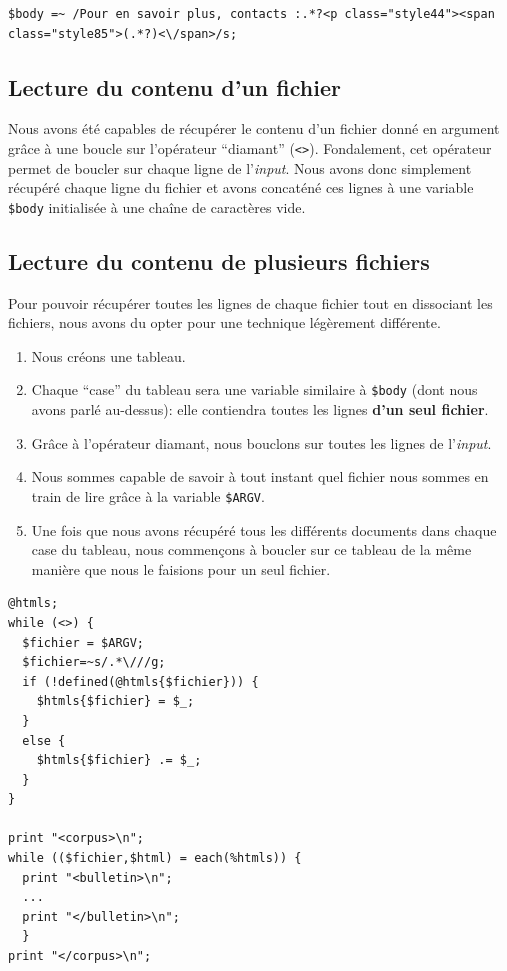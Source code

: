 \begin{lstlisting}
$body =~ /Pour en savoir plus, contacts :.*?<p class="style44"><span class="style85">(.*?)<\/span>/s;
\end{lstlisting}

\subsection{Lecture du contenu d'un fichier}

Nous avons été capables de récupérer le contenu d'un fichier donné en argument grâce à une boucle sur l'opérateur ``diamant'' (\lstinline{<>}). Fondalement, cet opérateur permet de boucler sur chaque ligne de l'\textit{input}. Nous avons donc simplement récupéré chaque ligne du fichier et avons concaténé ces lignes à une variable \lstinline{$body} initialisée à une chaîne de caractères vide.

\subsection{Lecture du contenu de plusieurs fichiers}

Pour pouvoir récupérer toutes les lignes de chaque fichier tout en dissociant les fichiers, nous avons du opter pour une technique légèrement différente.

\begin{enumerate}
  \item Nous créons une tableau.
  \item Chaque ``case'' du tableau sera une variable similaire à \lstinline{$body} (dont nous avons parlé au-dessus): elle contiendra toutes les lignes \textbf{d'un seul fichier}.
  \item Grâce à l'opérateur diamant, nous bouclons sur toutes les lignes de l'\textit{input}.
  \item Nous sommes capable de savoir à tout instant quel fichier nous sommes en train de lire grâce à la variable \lstinline{$ARGV}.
  \item Une fois que nous avons récupéré tous les différents documents dans chaque case du tableau, nous commençons à boucler sur ce tableau de la même manière que nous le faisions pour un seul fichier.
\end{enumerate}

\perl
\begin{lstlisting}
@htmls;
while (<>) {
  $fichier = $ARGV;
  $fichier=~s/.*\///g;
  if (!defined(@htmls{$fichier})) {
    $htmls{$fichier} = $_;
  }
  else {
    $htmls{$fichier} .= $_;
  }
}

print "<corpus>\n";
while (($fichier,$html) = each(%htmls)) {
  print "<bulletin>\n";
  ...
  print "</bulletin>\n";
  }
print "</corpus>\n";
\end{lstlisting}

